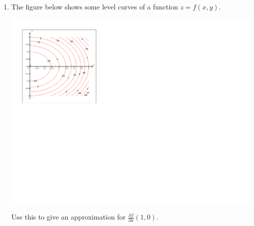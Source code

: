 \documentclass[12pt]{article}
\newif\ifans
\begin{document}
\begin{enumerate}
\begin{enumerate}
\end{enumerate}

\item The figure below shows some level curves of a function $z=f(x,y)$.

\begin{center}
\includegraphics[scale=1]{contour.pdf}
\end{center}

Use this to give an approximation for $\frac{\partial f}{\partial x}(1,0)$.

\ifans{\fbox{\parbox{1\linewidth}{The slope is approximately 2.  Note: You should use the level curve which passes through $(1,0)$ as well as one which is close to $(1,0)$ to \underline{estimate} the slope.}}} \fi

\end{enumerate}
\end{document}
